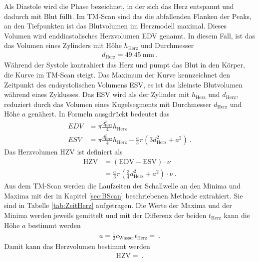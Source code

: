 Als Diastole wird die Phase bezeichnet, in der sich das Herz entspannt und dadurch mit Blut füllt. Im TM-Scan sind das die abfallenden Flanken der Peaks, an den Tiefpunkten ist das Blutvolumen im Herzmodell maximal. Dieses Volumen wird enddiastolisches Herzvolumen EDV genannt. In diesem Fall, ist das das Volumen eines Zylinders mit Höhe $h_\text{Herz}$ und Durchmesser
\begin{align}
        d_\text{Herz} = \SI{49.45}{\milli\meter} \ .
\end{align}
Während der Systole kontrahiert das Herz und pumpt das Blut in den Körper, die Kurve im TM-Scan steigt. Das Maximum der Kurve kennzeichnet den Zeitpunkt des endsystolischen Volumens ESV, es ist das kleinste Blutvolumen während eines Zyklusses. Das ESV wird als der Zylinder mit $h_\text{Herz}$ und $d_\text{Herz}$, reduziert durch das Volumen eines Kugelsegments mit Durchmesser $d_\text{Herz}$ und Höhe $a$ genähert. In Formeln ausgdrückt bedeutet das
\begin{align}
	EDV &= \pi \frac{d^2_\text{Herz}}{4} h_\text{Herz} \\
	ESV &= \pi \frac{d^2_\text{Herz}}{4} h_\text{Herz} - \frac{a}{3} \pi (3d_\text{Herz}^2 + a^2) \ .
\end{align}
Das Herzvolumen HZV ist definiert als
\begin{align}
	\text{HZV} &= (\text{EDV} - \text{ESV}) \cdot \nu \\
	&= \frac{a}{3} \pi (\frac{3}{4}d_\text{Herz}^2 + a^2) \cdot \nu \ .
\end{align}
Aus dem TM-Scan werden die Laufzeiten der Schallwelle an den Minima und Maxima mit der in Kapitel \ref{sec:BScan} beschriebenen Methode extrahiert. Sie sind in Tabelle \ref{tab:ZeitHerz} aufgetragen. Die Werte der Maxima und der Minima werden jeweils gemittelt und mit der Differenz der beiden $t_\text{Herz}$ kann die Höhe $a$ bestimmt werden
\begin{align}
	a = \frac{1}{2}c_\text{Wasser}t_\text{Herz} =  \ .
\end{align}
Damit kann das Herzvolumen bestimmt werden
\begin{align}
	\text{HZV} =  \ .
\end{align}


